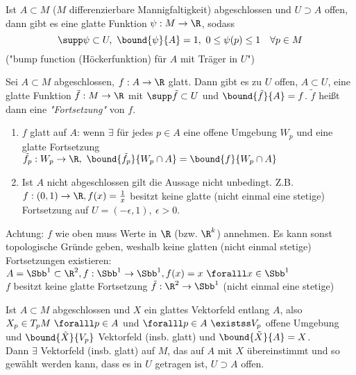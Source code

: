 \lecture
\begin{lem}
	Ist $ A \subset M $ ($M$ differenzierbare Mannigfaltigkeit) abgeschlossen und $U \supset A$ offen, dann gibt es eine glatte Funktion $\psi: M \to \R$, sodass
	\[ \supp \psi \subset U,\ \bound{\psi}{A} = 1,\ 0 \leq \psi(p) \leq 1 \quad \forall p \in M \]
	("bump function (Höckerfunktion) für $A$ mit Träger in $U$")
\end{lem}

\begin{lem}
	Sei $A \subset M$ abgeschlossen, $ f: A \to \R $ glatt. Dann gibt es zu $U$ offen, $A \subset U$, eine glatte Funktion $\tilde{f}: M \to \R$ mit $ \supp \tilde{f} \subset U $ und $ \bound{\tilde{f}}{A} = f $. $\tilde{f}$ heißt dann eine \emph{"Fortsetzung"} von $f$.
\end{lem}

\begin{rem*}
	\begin{enumerate}[label={\roman*})]
		\item $f$ glatt auf $A$: wenn $\exists$ für jedes $p \in A$ eine offene Umgebung $W_p$ und eine glatte Fortsetzung $ \tilde{f}_p: W_p \to \R,\ \bound{\tilde{f}_p}{W_p \cap A} = \bound{f}{W_p\cap A} $
		\item Ist $A$ nicht abgeschlossen gilt die Aussage nicht unbedingt. Z.B. $ f:(0,1) \to \R, f(x) = \frac{1}{x} $ besitzt keine glatte (nicht einmal eine stetige) Fortsetzung auf $U = (-\epsilon,1),\ \epsilon > 0$.
	\end{enumerate}
\end{rem*}

\begin{rem*}
	Achtung: $f$ wie oben muss Werte in $\R$ (bzw. $\R^k$) annehmen. Es kann sonst topologische Gründe geben, weshalb keine glatten (nicht einmal stetige) Fortsetzungen existieren:\\
	$ A = \Sbb^1 \subset \R^2, f: \Sbb^1 \to \Sbb^1, f(x) = x \ \foralll x \in \Sbb^1 $\\
	$f$ besitzt keine glatte Fortsetzung $ \tilde{f}: \R^2 \to \Sbb^1 $ (nicht einmal eine stetige)
\end{rem*}

\begin{lem}
	Ist $ A \subset M $ abgeschlossen und $X$ ein glattes Vektorfeld entlang $A$, also $ X_p \in T_pM \ \foralll p \in A $ und $\foralll p \in A \ \existss V_p$ offene Umgebung und $ \bound{\tilde{X}}{V_p} $ Vektorfeld (insb. glatt) und $\bound{\tilde{X}}{A} = X$.\\
	Dann $\exists$ Vektorfeld (insb. glatt) auf $M$, das auf $A$ mit $X$ übereinstimmt und so gewählt werden kann, dass es in $U$ getragen ist, $U \supset A$ offen.
\end{lem}